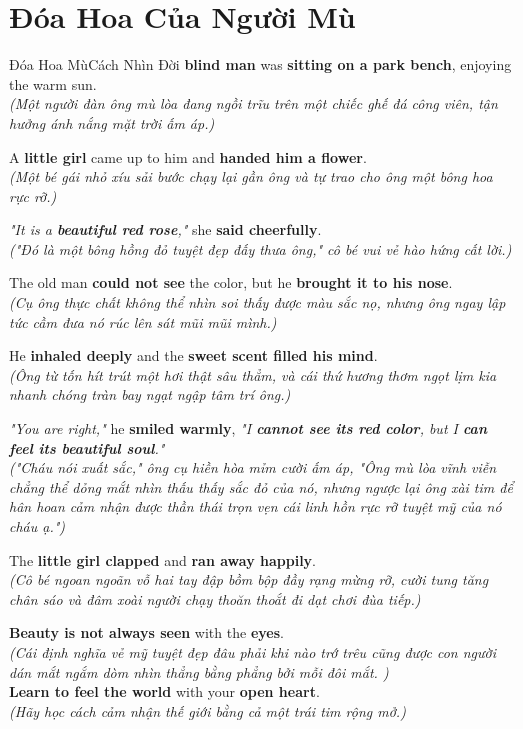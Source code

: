 \section{Đóa Hoa Của Người Mù}
\begin{truyen}{Đóa Hoa Mù}{Cách Nhìn Đời}
 \textbf{blind man} was \textbf{sitting on a park bench}, enjoying the warm sun.\\
\textit{(Một người đàn ông mù lòa đang ngồi trĩu trên một chiếc ghế đá công viên, tận hưởng ánh nắng mặt trời ấm áp.)}

A \textbf{little girl} came up to him and \textbf{handed him a flower}.\\
\textit{(Một bé gái nhỏ xíu sải bước chạy lại gần ông và tự trao cho ông một bông hoa rực rỡ.)}

\textit{"It is a \textbf{beautiful red rose},"} she \textbf{said cheerfully}.\\
\textit{("Đó là một bông hồng đỏ tuyệt đẹp đấy thưa ông," cô bé vui vẻ hào hứng cất lời.)}

The old man \textbf{could not see} the color, but he \textbf{brought it to his nose}.\\
\textit{(Cụ ông thực chất không thể nhìn soi thấy được màu sắc nọ, nhưng ông ngay lập tức cầm đưa nó rúc lên sát mũi mũi mình.)}

He \textbf{inhaled deeply} and the \textbf{sweet scent filled his mind}.\\
\textit{(Ông từ tốn hít trút một hơi thật sâu thẳm, và cái thứ hương thơm ngọt lịm kia nhanh chóng tràn bay ngạt ngập tâm trí ông.)}

\textit{"You are right,"} he \textbf{smiled warmly}, \textit{"I \textbf{cannot see its red color}, but I \textbf{can feel its beautiful soul}."}\\
\textit{("Cháu nói xuất sắc," ông cụ hiền hòa mỉm cười ấm áp, "Ông mù lòa vĩnh viễn chẳng thể dỏng mắt nhìn thấu thấy sắc đỏ của nó, nhưng ngược lại ông xài tim để hân hoan cảm nhận được thần thái trọn vẹn cái linh hồn rực rỡ tuyệt mỹ của nó cháu ạ.")}

The \textbf{little girl clapped} and \textbf{ran away happily}.\\
\textit{(Cô bé ngoan ngoãn vỗ hai tay đập bồm bộp đầy rạng mừng rỡ, cười tung tăng chân sáo và đâm xoài người chạy thoăn thoắt đi dạt chơi đùa tiếp.)}
\end{truyen}

\begin{baihoc}
  \textbf{Beauty is not always seen} with the \textbf{eyes}.\\
  \textit{(Cái định nghĩa vẻ mỹ tuyệt đẹp đâu phải khi nào trớ trêu cũng được con người dán mắt ngắm dòm nhìn thẳng bằng phẳng bởi mỗi đôi mắt. )}\\
  \textbf{Learn to feel the world} with your \textbf{open heart}.\\
  \textit{(Hãy học cách cảm nhận thế giới bằng cả một trái tim rộng mở.)}
\end{baihoc}

\vspace{0.8cm}
